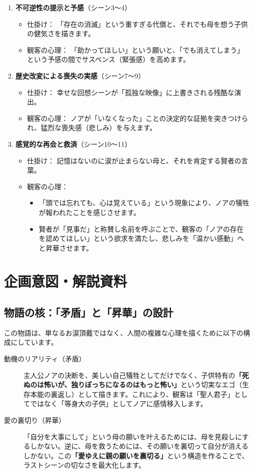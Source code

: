 \begin{enumerate}
\item \textbf{不可逆性の提示と予感}（シーン3〜4）
\begin{itemize}
\item 仕掛け： 「存在の消滅」という重すぎる代償と、それでも母を想う子供の健気さを描きます。
\item 観客の心理： 「助かってほしい」という願いと、「でも消えてしまう」という予感の間でサスペンス（緊張感）を高めます。
\end{itemize}
\item \textbf{歴史改変による喪失の実感}（シーン7〜9）
\begin{itemize}
\item 仕掛け： 幸せな回想シーンが「孤独な映像」に上書きされる残酷な演出。
\item 観客の心理： ノアが「いなくなった」ことの決定的な証拠を突きつけられ、猛烈な喪失感（悲しみ）を与えます。
\end{itemize}
\item \textbf{感覚的な再会と救済}（シーン10〜11）
\begin{itemize}
\item 仕掛け： 記憶はないのに涙が止まらない母と、それを肯定する賢者の言葉。
\item 観客の心理：
\begin{itemize}
\item 「頭では忘れても、心は覚えている」という現象により、ノアの犠牲が報われたことを感じさせます。
\item 賢者が「見事だ」と称賛し名前を呼ぶことで、観客の「ノアの存在を認めてほしい」という欲求を満たし、悲しみを「温かい感動」へと昇華させます。
\end{itemize}
\end{itemize}
\end{enumerate}



\clearpage\section{企画意図・解説資料}
\subsection{物語の核：「矛盾」と「昇華」の設計}
この物語は、単なるお涙頂戴ではなく、人間の複雑な心理を描くために以下の構成にしています。
\begin{description}
    \item [動機のリアリティ（矛盾）] 
    主人公ノアの決断を、美しい自己犠牲としてだけでなく、子供特有の\textbf{「死ぬのは怖いが、独りぼっちになるのはもっと怖い」}という切実なエゴ（生存本能の裏返し）として描きます。これにより、観客は「聖人君子」としてではなく「等身大の子供」としてノアに感情移入します。
    \item [愛の裏切り（昇華）] 
    「自分を大事にして」という母の願いを叶えるためには、母を見殺しにするしかない。逆に、母を救うためには、その願いを裏切って自分が消えるしかない。この\textbf{「愛ゆえに親の願いを裏切る」}という構造を作ることで、ラストシーンの切なさを最大化します。
\end{description}


